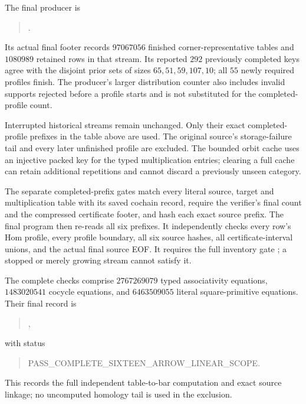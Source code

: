 \begin{remark}
\label{C:sixteen-linear-complete-verification}
The final producer is
\begin{quote}\small
{}.
\end{quote}
Its actual final footer records $97067056$ finished
corner-representative tables and $1080989$ retained rows
in that stream.  Its reported $292$ previously completed
keys agree with the disjoint prior sets of sizes
$65,51,59,107,10$; all $55$ newly required profiles finish.
The producer's larger distribution counter also includes
invalid supports rejected before a profile starts and
is not substituted for the completed-profile count.

Interrupted historical streams remain unchanged.
Only their exact completed-profile prefixes in the table
above are used.  The original source's storage-failure
tail and every later unfinished profile are excluded.
The bounded orbit cache uses an injective packed key
for the typed multiplication entries; clearing a full
cache can retain additional repetitions and cannot
discard a previously unseen category.

The separate completed-prefix gates match every literal
source, target and multiplication table with its saved
cochain record, require the verifier's final count and
the compressed certificate footer, and hash each exact
source prefix.  The final program
then re-reads all six prefixes.  It independently checks
every row's Hom profile, every profile boundary, all
six source hashes, all certificate-interval unions,
and the actual final source EOF.  It requires the full
inventory gate
;
a stopped or merely growing stream cannot satisfy it.

The complete checks comprise $2767269079$ typed
associativity equations, $1483020541$ cocycle equations,
and $6463509055$ literal square-primitive equations.
Their final record is
\begin{quote}\small
{},
\end{quote}
with status
\begin{quote}\small\ttfamily
PASS\_COMPLETE\_SIXTEEN\_ARROW\_LINEAR\_SCOPE.
\end{quote}
This records the full independent table-to-bar computation
and exact source linkage; no uncomputed homology tail is
used in the exclusion.
\end{remark}

